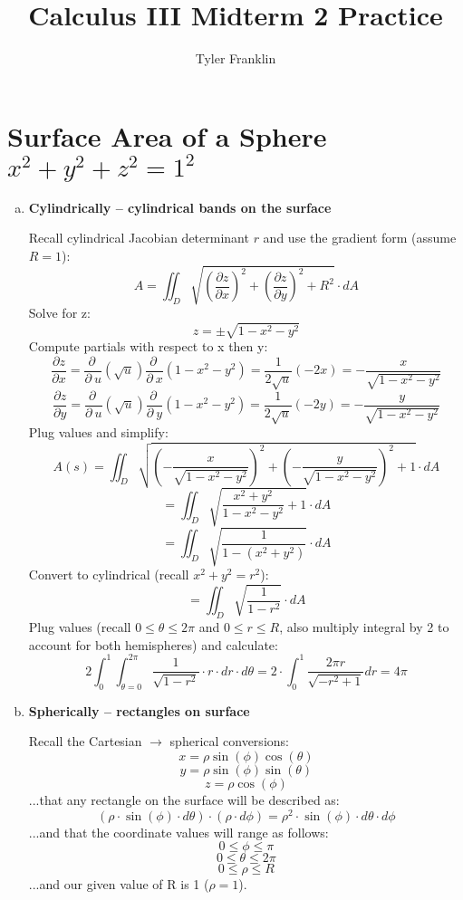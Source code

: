 \documentclass{article}
\title{Calculus III Midterm 2 Practice}
\author{Tyler Franklin}
\begin{document}
\maketitle

\section{Surface Area of a Sphere $x^2 + y^2 + z^2 = 1^2$ }
\begin{enumerate}[a.]
	\item \textbf{Cylindrically -- cylindrical bands on the surface }

            Recall cylindrical Jacobian determinant $ r $ and use the gradient form (assume $R = 1$):
            \[ A = \iint_{D}\sqrt{ (\frac{\partial z}{\partial x})^2 + (\frac{\partial z}{\partial y})^2 + R^2 } \cdot dA \]
            Solve for z:
            \[ z = \pm\sqrt{1-x^{2}-y^{2}} \]
            Compute partials with respect to x then y:
            \[ \frac{\partial z}{\partial x} = \frac{\partial \:}{\partial \:u}\left(\sqrt{u}\right)\frac{\partial \:}{\partial \:x}\left(1-x^2-y^2\right) = \frac{1}{2\sqrt{u}}\left(-2x\right) = -\frac{x}{\sqrt{1-x^2-y^2}} \]
            \[ \frac{\partial z}{\partial y} = \frac{\partial \:}{\partial \:u}\left(\sqrt{u}\right)\frac{\partial \:}{\partial \:y}\left(1-x^2-y^2\right) = \frac{1}{2\sqrt{u}}\left(-2y\right) = -\frac{y}{\sqrt{1-x^2-y^2}} \]
            Plug values and simplify:
            \[ A(s) = \iint_{D}\sqrt{\left(-\frac{x}{\sqrt{1-x^2-y^2}}\right)^2+\left(-\frac{y}{\sqrt{1-x^2-y^2}}\right)^2+1}  \cdot dA \]
            \[ = \iint_{D}\sqrt{\frac{x^2+y^2}{1-x^2-y^2}+1}  \cdot dA \]
            \[ = \iint_{D}\sqrt{\frac{1}{1-(x^2+y^2)}}  \cdot dA \]
            Convert to cylindrical (recall $x^2 + y^2 = r^2$):
            \[ = \iint_{D}\sqrt{\frac{1}{1-r^2}}  \cdot dA \]
            Plug values (recall $0 \leq \theta \leq 2\pi $ and $0 \leq r \leq R $, also multiply integral by 2 to account for both hemispheres) and calculate:
            \[ 2\int_{0}^{1}\int_{\theta=0}^{2\pi} \frac{1}{\sqrt{1-r^2}}\cdot r \cdot dr \cdot d\theta = 2\cdot \int _0^1\frac{2\pi r}{\sqrt{-r^2+1}}dr = 4\pi \]

	\item \textbf{Spherically -- rectangles on surface}

            Recall the Cartesian $\rightarrow$ spherical conversions:
            \[ x = \rho\sin(\phi)\cos(\theta)   \]
            \[ y = \rho\sin(\phi)\sin(\theta)  \]
            \[ z = \rho\cos(\phi)  \]
            ...that any rectangle on the surface will be described as:
            \[ (\rho\cdot\sin(\phi)\cdot d \theta)\cdot(\rho\cdot d \phi) = \rho^2\cdot\sin(\phi)\cdot d\theta\cdot d\phi \]
            ...and that the coordinate values will range as follows:
            \[ 0 \leq \phi \leq \pi  \]
            \[ 0 \leq \theta \leq 2\pi  \]
            \[ 0 \leq \rho \leq R \]
            ...and our given value of R is 1 ($\rho = 1$).


\end{enumerate}
\end{document}
